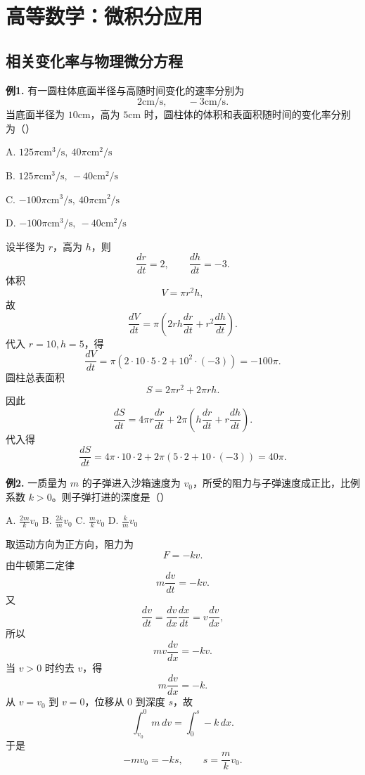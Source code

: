 \chapter{高等数学：微积分应用}

\section{相关变化率与物理微分方程}

\begin{problemblock}
\textbf{例1.} 有一圆柱体底面半径与高随时间变化的速率分别为
\[
2\mathrm{cm}/\mathrm{s},\qquad -3\mathrm{cm}/\mathrm{s}.
\]
当底面半径为 \(10\mathrm{cm}\)，高为 \(5\mathrm{cm}\) 时，圆柱体的体积和表面积随时间的变化率分别为（\quad）

A. \(125\pi\mathrm{cm}^3/\mathrm{s},\ 40\pi\mathrm{cm}^2/\mathrm{s}\)

B. \(125\pi\mathrm{cm}^3/\mathrm{s},\ -40\mathrm{cm}^2/\mathrm{s}\)

C. \(-100\pi\mathrm{cm}^3/\mathrm{s},\ 40\pi\mathrm{cm}^2/\mathrm{s}\)

D. \(-100\pi\mathrm{cm}^3/\mathrm{s},\ -40\mathrm{cm}^2/\mathrm{s}\)
\end{problemblock}
\begin{solutionblock}
设半径为 \(r\)，高为 \(h\)，则
\[
\frac{dr}{dt}=2,\qquad \frac{dh}{dt}=-3.
\]
体积
\[
V=\pi r^2h,
\]
故
\[
\frac{dV}{dt}
=\pi\left(2rh\frac{dr}{dt}+r^2\frac{dh}{dt}\right).
\]
代入 \(r=10,h=5\)，得
\[
\frac{dV}{dt}
=\pi(2\cdot10\cdot5\cdot2+10^2\cdot(-3))
=-100\pi.
\]
圆柱总表面积
\[
S=2\pi r^2+2\pi rh.
\]
因此
\[
\frac{dS}{dt}
=4\pi r\frac{dr}{dt}
+2\pi\left(h\frac{dr}{dt}+r\frac{dh}{dt}\right).
\]
代入得
\[
\frac{dS}{dt}
=4\pi\cdot10\cdot2+2\pi(5\cdot2+10\cdot(-3))
=40\pi.
\]
\end{solutionblock}

\begin{problemblock}
\textbf{例2.} 一质量为 \(m\) 的子弹进入沙箱速度为 \(v_0\)，所受的阻力与子弹速度成正比，比例系数 \(k>0\)。则子弹打进的深度是（\quad）

A. \(\displaystyle \frac{2m}{k}v_0\)
\quad B. \(\displaystyle \frac{2k}{m}v_0\)
\quad C. \(\displaystyle \frac{m}{k}v_0\)
\quad D. \(\displaystyle \frac{k}{m}v_0\)
\end{problemblock}
\begin{solutionblock}
取运动方向为正方向，阻力为
\[
F=-kv.
\]
由牛顿第二定律
\[
m\frac{dv}{dt}=-kv.
\]
又
\[
\frac{dv}{dt}=\frac{dv}{dx}\frac{dx}{dt}=v\frac{dv}{dx},
\]
所以
\[
mv\frac{dv}{dx}=-kv.
\]
当 \(v>0\) 时约去 \(v\)，得
\[
m\frac{dv}{dx}=-k.
\]
从 \(v=v_0\) 到 \(v=0\)，位移从 \(0\) 到深度 \(s\)，故
\[
\int_{v_0}^{0}m\,dv=\int_0^s -k\,dx.
\]
于是
\[
-mv_0=-ks,
\qquad
s=\frac{m}{k}v_0.
\]
\end{solutionblock}

